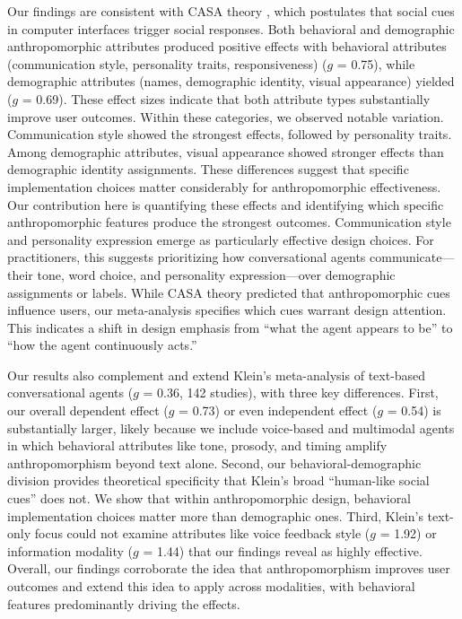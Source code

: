 \documentclass[manuscript,anonymous,sigconf]{acmart}
\begin{document}
Our findings are consistent with CASA theory \citep{nass1997machines}, which postulates that social cues in computer interfaces trigger social responses. Both behavioral and demographic anthropomorphic attributes produced positive effects with behavioral attributes (communication style, personality traits, responsiveness) ($g$ = 0.75), while demographic attributes (names, demographic identity, visual appearance) yielded ($g$ = 0.69). These effect sizes indicate that both attribute types substantially improve user outcomes.
Within these categories, we observed notable variation. Communication style showed the strongest effects, followed by personality traits. Among demographic attributes, visual appearance  showed stronger effects than demographic identity assignments. These differences suggest that specific implementation choices matter considerably for anthropomorphic effectiveness.
Our contribution here is quantifying these effects and identifying which specific anthropomorphic features produce the strongest outcomes. Communication style and personality expression emerge as particularly effective design choices. For practitioners, this suggests prioritizing how conversational agents communicate---their tone, word choice, and personality expression---over demographic assignments or labels. While CASA theory predicted that anthropomorphic cues influence users, our meta-analysis specifies which cues warrant design attention. This indicates a shift in design emphasis from ``what the agent appears to be'' to ``how the agent continuously acts.''

Our results also complement and extend Klein's \cite{klein_effects_2025} meta-analysis of text-based conversational agents ($g$ = 0.36, 142 studies), with three key differences. First, our overall dependent effect ($g$ = 0.73) or even independent effect ($g$ = 0.54) is substantially larger, likely because we include voice-based and multimodal agents in which behavioral attributes like tone, prosody, and timing amplify anthropomorphism beyond text alone. Second, our behavioral-demographic division provides theoretical specificity that Klein's broad ``human-like social cues'' does not. We show that within anthropomorphic design, behavioral implementation choices matter more than demographic ones. Third, Klein's text-only focus could not examine attributes like voice feedback style ($g$ = 1.92) or information modality ($g$ = 1.44) that our findings reveal as highly effective. Overall, our findings corroborate the idea that anthropomorphism improves user outcomes \citep{klein_effects_2025} and extend this idea to apply across modalities, with behavioral features predominantly driving the effects.
\end{document}
